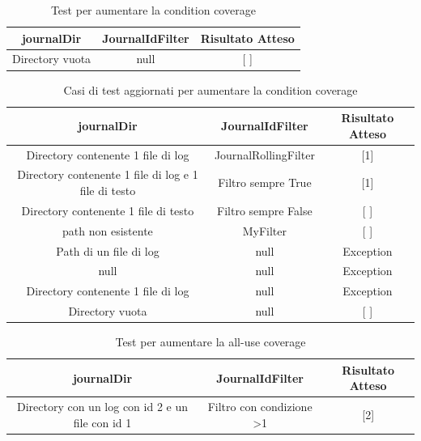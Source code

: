 \documentclass[10pt, a4paper]{article}
\begin{document}
\begin{table}[ht]
  \centering
  \caption[Journal: Test Suite - Adequacy Control Flow 3]{Test per aumentare la condition coverage}
  \begin{tabular}{|c|c|c|}
    \hline
    journalDir & JournalIdFilter & Risultato Atteso \\
    \hline
    {Directory vuota} & null & [ ] \\
    \hline
  \end{tabular}
  \label{tab:ACF3ListJournalIds}
\end{table}

\begin{table}[ht]
  \centering
  \caption[Journal: Test Suite - Adequacy Control Flow 4]{Casi di test aggiornati per aumentare la condition coverage}
  \begin{tabular}{|c|c|c|}
  \hline
  journalDir & JournalIdFilter & Risultato Atteso \\
  \hline
  {Directory contenente 1 file di log} & JournalRollingFilter & [1] \\
  {Directory contenente 1 file di log e 1 file di testo} & Filtro sempre True & [1] \\
  {Directory contenente 1 file di testo} & Filtro sempre False & [ ] \\
  {path non esistente} & MyFilter & [ ] \\
  {Path di un file di log} & null & Exception \\
  null & null & Exception \\
  {Directory contenente 1 file di log} & null & Exception \\
  {Directory vuota} & null & [ ] \\
  \hline
  \end{tabular}
  \label{tab:ACF4ListJournalIds}
\end{table}

  \begin{table}[ht]
    \centering
    \caption[Journal: Test Suite - Adequacy Data Flow 1]{Test per aumentare la all-use coverage}
    \begin{tabular}{|c|c|c|}
      \hline
      journalDir & JournalIdFilter & Risultato Atteso \\
      \hline
      {Directory con un log con id 2 e un file con id 1} & {Filtro con condizione \textgreater1} & [2] \\
      \hline
    \end{tabular}
    \label{tab:ADF1ListJournalIds}
  \end{table}
\end{document}

